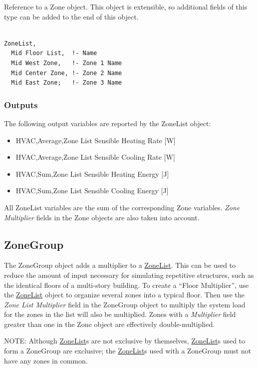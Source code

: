 Reference to a Zone object. This object is extensible, so additional fields of this type can be added to the end of this object.

\begin{lstlisting}

ZoneList,
  Mid Floor List,  !- Name
  Mid West Zone,   !- Zone 1 Name
  Mid Center Zone, !- Zone 2 Name
  Mid East Zone;   !- Zone 3 Name
\end{lstlisting}

\subsubsection{Outputs}\label{outputs-1-028}

The following output variables are reported by the ZoneList object:

\begin{itemize}
\item
  HVAC,Average,Zone List Sensible Heating Rate {[}W{]}
\item
  HVAC,Average,Zone List Sensible Cooling Rate {[}W{]}
\item
  HVAC,Sum,Zone List Sensible Heating Energy {[}J{]}
\item
  HVAC,Sum,Zone List Sensible Cooling Energy {[}J{]}
\end{itemize}

All ZoneList variables are the sum of the corresponding Zone variables. \emph{Zone Multiplier} fields in the Zone objects are also taken into account.

\subsection{ZoneGroup}\label{zonegroup}

The ZoneGroup object adds a multiplier to a \hyperref[zonelist]{ZoneList}. This can be used to reduce the amount of input necessary for simulating repetitive structures, such as the identical floors of a multi-story building. To create a ``Floor Multiplier'', use the \hyperref[zonelist]{ZoneList} object to organize several zones into a typical floor. Then use the \emph{Zone List Multiplier} field in the ZoneGroup object to multiply the system load for the zones in the list will also be multiplied. Zones with a \emph{Multiplier} field greater than one in the Zone object are effectively double-multiplied.

\begin{callout}
NOTE: Although \hyperref[zonelist]{ZoneList}s are not exclusive by themselves, \hyperref[zonelist]{ZoneList}s used to form a ZoneGroup are exclusive; the \hyperref[zonelist]{ZoneList}s used with a ZoneGroup must not have any zones in common.
\end{callout}

